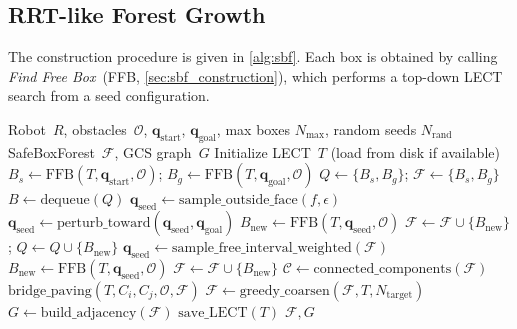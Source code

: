 \documentclass[letterpaper, conference]{IEEEtran}
\newcommand{\calO}{\mathcal{O}}
\newcommand{\calF}{\mathcal{F}}
\begin{document}
\subsection{RRT-like Forest Growth}\label{sec:sbf_forest}

The construction procedure is given in \cref{alg:sbf}.
Each box is obtained by calling \emph{Find Free Box}~(FFB,
\cref{sec:sbf_construction}), which performs a top-down LECT search from
a seed configuration.

\begin{algorithm}[t]
\caption{SafeBoxForest Construction}\label{alg:sbf}
\footnotesize
\begin{algorithmic}[1]
\REQUIRE Robot~$R$, obstacles~$\calO$, $\bm{q}_\text{start}$, $\bm{q}_\text{goal}$,
  max boxes $N_{\max}$, random seeds $N_{\text{rand}}$
\ENSURE SafeBoxForest~$\calF$, GCS graph~$G$
\STATE Initialize LECT~$T$ (load from disk if available)
\STATE $B_s \leftarrow \text{FFB}(T, \bm{q}_\text{start}, \calO)$;\;
       $B_g \leftarrow \text{FFB}(T, \bm{q}_\text{goal}, \calO)$
\STATE $Q \leftarrow \{B_s, B_g\}$;\;
       $\calF \leftarrow \{B_s, B_g\}$
\WHILE{$|\calF| < N_{\max}$ \AND $Q \neq \emptyset$}
  \STATE $B \leftarrow \text{dequeue}(Q)$
    \STATE $\bm{q}_\text{seed} \leftarrow \text{sample\_outside\_face}(f, \epsilon)$
      \STATE $\bm{q}_\text{seed} \leftarrow \text{perturb\_toward}(\bm{q}_\text{seed}, \bm{q}_\text{goal})$
    \ENDIF
    \STATE $B_\text{new} \leftarrow \text{FFB}(T, \bm{q}_\text{seed}, \calO)$
    \IF{$B_\text{new} \neq \emptyset$ \AND $B_\text{new} \notin \calF$}
      \STATE $\calF \leftarrow \calF \cup \{B_\text{new}\}$;\;
             $Q \leftarrow Q \cup \{B_\text{new}\}$
    \ENDIF
  \ENDFOR
\ENDWHILE
\STATE {}
  \STATE $\bm{q}_\text{seed} \leftarrow \text{sample\_free\_interval\_weighted}(\calF)$
  \STATE $B_\text{new} \leftarrow \text{FFB}(T, \bm{q}_\text{seed}, \calO)$
    \STATE $\calF \leftarrow \calF \cup \{B_\text{new}\}$
  \ENDIF
\ENDFOR
\STATE {}
\STATE $\mathcal{C} \leftarrow \text{connected\_components}(\calF)$
  \STATE $\text{bridge\_paving}(T, C_i, C_j, \calO, \calF)$
\ENDFOR
\STATE $\calF \leftarrow \text{greedy\_coarsen}(\calF, T, N_\text{target})$
\STATE $G \leftarrow \text{build\_adjacency}(\calF)$
\STATE $\text{save\_LECT}(T)$
\RETURN $\calF, G$
\end{algorithmic}
\end{algorithm}
\end{document}
